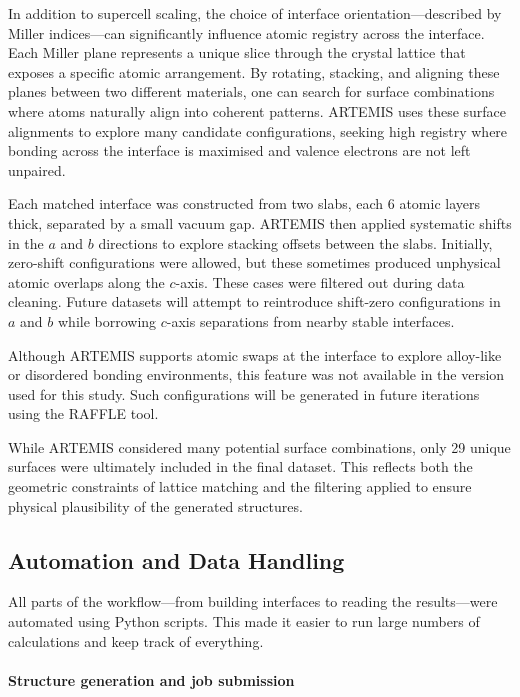 In addition to supercell scaling, the choice of interface orientation—described by Miller indices—can significantly influence atomic registry across the interface. Each Miller plane represents a unique slice through the crystal lattice that exposes a specific atomic arrangement. By rotating, stacking, and aligning these planes between two different materials, one can search for surface combinations where atoms naturally align into coherent patterns. ARTEMIS uses these surface alignments to explore many candidate configurations, seeking high registry where bonding across the interface is maximised and valence electrons are not left unpaired.

Each matched interface was constructed from two slabs, each 6 atomic layers thick, separated by a small vacuum gap. ARTEMIS then applied systematic shifts in the $a$ and $b$ directions to explore stacking offsets between the slabs. Initially, zero-shift configurations were allowed, but these sometimes produced unphysical atomic overlaps along the $c$-axis. These cases were filtered out during data cleaning. Future datasets will attempt to reintroduce shift-zero configurations in $a$ and $b$ while borrowing $c$-axis separations from nearby stable interfaces.

Although ARTEMIS supports atomic swaps at the interface to explore alloy-like or disordered bonding environments, this feature was not available in the version used for this study. Such configurations will be generated in future iterations using the RAFFLE tool.

While ARTEMIS considered many potential surface combinations, only 29 unique surfaces were ultimately included in the final dataset. This reflects both the geometric constraints of lattice matching and the filtering applied to ensure physical plausibility of the generated structures.

\subsection{Automation and Data Handling}

All parts of the workflow—from building interfaces to reading the results—were automated using Python scripts. This made it easier to run large numbers of calculations and keep track of everything.

\paragraph{Structure generation and job submission}

